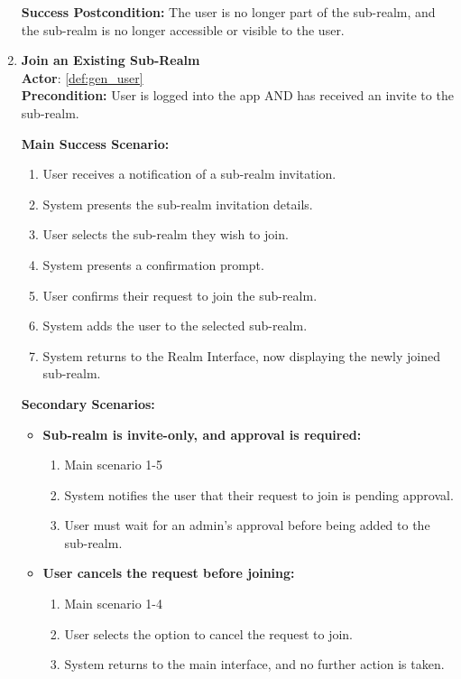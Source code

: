 \documentclass{article}
\begin{document}
\begin{enumerate}[label=\textbf{UC\arabic*}]
        \textbf{Success Postcondition:} The user is no longer part of the sub-realm, and the sub-realm is no longer accessible or visible to the user.

    \item \label{uc:19} \textbf{Join an Existing Sub-Realm} \\
        \textbf{Actor}: \ref{def:gen_user} \\
        \textbf{Precondition:} User is logged into the app AND has received an invite to the sub-realm.
    
        \textbf{Main Success Scenario:}
        \begin{enumerate}[label=\textbf{\arabic*.}]
            \item User receives a notification of a sub-realm invitation.
            \item System presents the sub-realm invitation details.
            \item User selects the sub-realm they wish to join.
            \item System presents a confirmation prompt.
            \item User confirms their request to join the sub-realm.
            \item System adds the user to the selected sub-realm.
            \item System returns to the Realm Interface, now displaying the newly joined sub-realm.
        \end{enumerate}
        
        \textbf{Secondary Scenarios:}
        \begin{itemize}
            \item[{}] \textbf{Sub-realm is invite-only, and approval is required:}
            \begin{enumerate}[label=\textbf{\arabic*.}]
                \item Main scenario 1-5
                \item System notifies the user that their request to join is pending approval.
                \item User must wait for an admin’s approval before being added to the sub-realm.
            \end{enumerate}
            
            \item[{}] \textbf{User cancels the request before joining:}
            \begin{enumerate}[label=\textbf{\arabic*.}]
                \item Main scenario 1-4
                \item User selects the option to cancel the request to join.
                \item System returns to the main interface, and no further action is taken.
            \end{enumerate}
        \end{itemize}
        

\end{enumerate}
\end{document}
